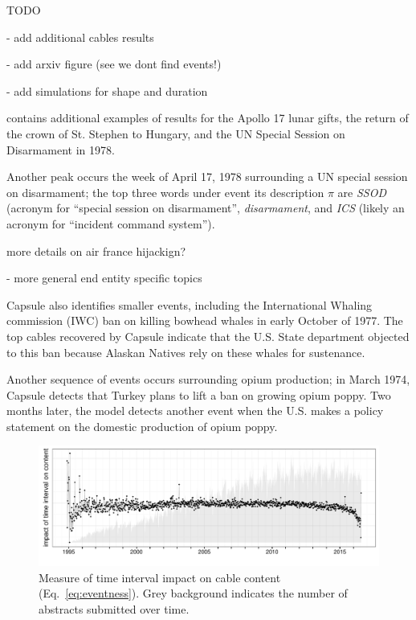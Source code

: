 
TODO

- add additional cables results 

- add arxiv figure (see we dont find events!)

- add simulations for shape and duration



\parhead{}
contains additional examples of results for the 
Apollo 17 lunar gifts, the return of the crown of St. Stephen to Hungary, and the UN Special Session on Disarmament in 1978.


Another peak occurs the week of April 17, 1978 surrounding a UN special session on disarmament; the top three words under event its description $\pi$ are \emph{SSOD} (acronym for ``special session on disarmament'', \emph{disarmament}, and \emph{ICS} (likely an acronym for ``incident command system'').

more details on air france hijackign?

- more general end entity specific topics

Capsule also identifies smaller events, including the International Whaling commission (IWC) ban on killing bowhead whales in early October of 1977.  The top cables recovered by Capsule indicate that the U.S. State department objected to this ban because Alaskan Natives rely on these whales for sustenance.

Another sequence of events occurs surrounding opium production; in March 1974, Capsule detects that Turkey plans to lift a ban on growing opium poppy.  Two months later, the model detects another event when the U.S. makes a policy statement on the domestic production of opium poppy.



\begin{figure}[ht]
\centering
\includegraphics[width=\linewidth]{fig/arxiv_events.pdf}
\caption{Measure of time interval impact on cable content (Eq.~\ref{eq:eventness}).  Grey background indicates the number of abstracts submitted over time.}
\label{fig:arxiv_events}
\end{figure}